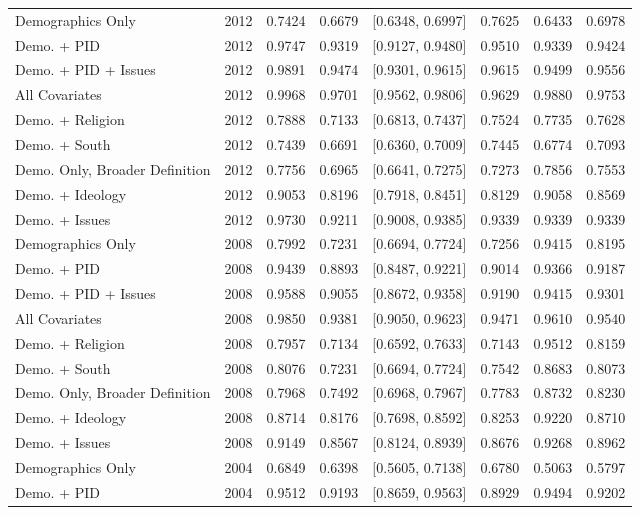 \begin{longtable}{lrrrlrrr}
  Demographics Only & 2012 & 0.7424 & 0.6679 & [0.6348, 0.6997] & 0.7625 & 0.6433 & 0.6978 \\ 
  Demo. + PID & 2012 & 0.9747 & 0.9319 & [0.9127, 0.9480] & 0.9510 & 0.9339 & 0.9424 \\ 
  Demo. + PID + Issues & 2012 & 0.9891 & 0.9474 & [0.9301, 0.9615] & 0.9615 & 0.9499 & 0.9556 \\ 
  All Covariates & 2012 & 0.9968 & 0.9701 & [0.9562, 0.9806] & 0.9629 & 0.9880 & 0.9753 \\ 
  Demo. + Religion & 2012 & 0.7888 & 0.7133 & [0.6813, 0.7437] & 0.7524 & 0.7735 & 0.7628 \\ 
  Demo. + South & 2012 & 0.7439 & 0.6691 & [0.6360, 0.7009] & 0.7445 & 0.6774 & 0.7093 \\ 
  Demo. Only, Broader Definition & 2012 & 0.7756 & 0.6965 & [0.6641, 0.7275] & 0.7273 & 0.7856 & 0.7553 \\ 
  Demo. + Ideology & 2012 & 0.9053 & 0.8196 & [0.7918, 0.8451] & 0.8129 & 0.9058 & 0.8569 \\ 
  Demo. + Issues & 2012 & 0.9730 & 0.9211 & [0.9008, 0.9385] & 0.9339 & 0.9339 & 0.9339 \\ 
  Demographics Only & 2008 & 0.7992 & 0.7231 & [0.6694, 0.7724] & 0.7256 & 0.9415 & 0.8195 \\ 
  Demo. + PID & 2008 & 0.9439 & 0.8893 & [0.8487, 0.9221] & 0.9014 & 0.9366 & 0.9187 \\ 
  Demo. + PID + Issues & 2008 & 0.9588 & 0.9055 & [0.8672, 0.9358] & 0.9190 & 0.9415 & 0.9301 \\ 
  All Covariates & 2008 & 0.9850 & 0.9381 & [0.9050, 0.9623] & 0.9471 & 0.9610 & 0.9540 \\ 
  Demo. + Religion & 2008 & 0.7957 & 0.7134 & [0.6592, 0.7633] & 0.7143 & 0.9512 & 0.8159 \\ 
  Demo. + South & 2008 & 0.8076 & 0.7231 & [0.6694, 0.7724] & 0.7542 & 0.8683 & 0.8073 \\ 
  Demo. Only, Broader Definition & 2008 & 0.7968 & 0.7492 & [0.6968, 0.7967] & 0.7783 & 0.8732 & 0.8230 \\ 
  Demo. + Ideology & 2008 & 0.8714 & 0.8176 & [0.7698, 0.8592] & 0.8253 & 0.9220 & 0.8710 \\ 
  Demo. + Issues & 2008 & 0.9149 & 0.8567 & [0.8124, 0.8939] & 0.8676 & 0.9268 & 0.8962 \\ 
  Demographics Only & 2004 & 0.6849 & 0.6398 & [0.5605, 0.7138] & 0.6780 & 0.5063 & 0.5797 \\ 
  Demo. + PID & 2004 & 0.9512 & 0.9193 & [0.8659, 0.9563] & 0.8929 & 0.9494 & 0.9202 \\ 

\end{longtable}
